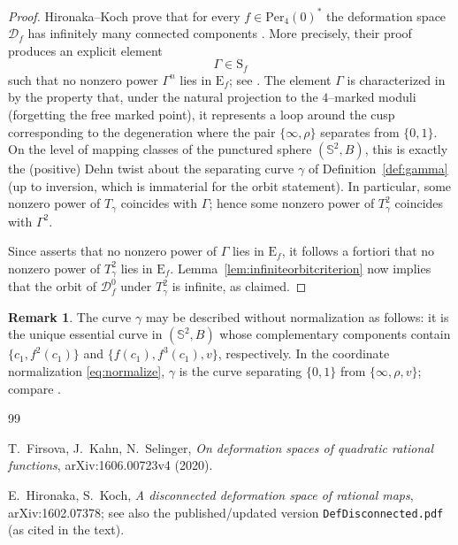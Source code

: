 \documentclass[11pt]{article}
\theoremstyle{definition}
\newtheorem{remark}[theorem]{Remark}
\newcommand{\Sph}{\mathbb{S}^2}
\newcommand{\Def}{\mathcal{D}}
\begin{document}
\begin{proof}
Hironaka--Koch prove that for every $f\in \mathrm{Per}_4(0)^\ast$ the deformation space $\Def_f$ has infinitely many connected components \cite[Thm.\ 1.3]{HK}. More precisely, their proof produces an explicit element
\[
\Gamma\in \mathrm{S}_f
\]
such that no nonzero power $\Gamma^n$ lies in $\mathrm{E}_f$; see \cite[Prop.\ 5.6 and Prop.\ 5.8]{HK}. The element $\Gamma$ is characterized in \cite[Prop.\ 5.6]{HK} by the property that, under the natural projection to the $4$--marked moduli (forgetting the free marked point), it represents a loop around the cusp corresponding to the degeneration where the pair $\{\infty,\rho\}$ separates from $\{0,1\}$. On the level of mapping classes of the punctured sphere $(\Sph,B)$, this is exactly the (positive) Dehn twist about the separating curve $\gamma$ of Definition~\ref{def:gamma} (up to inversion, which is immaterial for the orbit statement). In particular, some nonzero power of $T_\gamma$ coincides with $\Gamma$; hence some nonzero power of $T_\gamma^2$ coincides with $\Gamma^2$.

Since \cite[Prop.\ 5.8]{HK} asserts that no nonzero power of $\Gamma$ lies in $\mathrm{E}_f$, it follows a fortiori that no nonzero power of $T_\gamma^2$ lies in $\mathrm{E}_f$. Lemma~\ref{lem:infiniteorbitcriterion} now implies that the orbit of $\Def_f^0$ under $T_\gamma^2$ is infinite, as claimed.
\end{proof}

\begin{remark}
The curve $\gamma$ may be described without normalization as follows: it is the unique essential curve in $(\Sph,B)$ whose complementary components contain $\{c_1,f^2(c_1)\}$ and $\{f(c_1),f^3(c_1),v\}$, respectively. In the coordinate normalization \eqref{eq:normalize}, $\gamma$ is the curve separating $\{0,1\}$ from $\{\infty,\rho,v\}$; compare \cite[Fig.\ 2 and Table 1, case (6)]{FKS}.
\end{remark}

\begin{thebibliography}{99}

T.~Firsova, J.~Kahn, N.~Selinger,
\newblock \emph{On deformation spaces of quadratic rational functions},
\newblock arXiv:1606.00723v4 (2020). 

E.~Hironaka, S.~Koch,
\newblock \emph{A disconnected deformation space of rational maps},
\newblock arXiv:1602.07378; see also the published/updated version \texttt{DefDisconnected.pdf} (as cited in the text).

\end{thebibliography}
\end{document}
